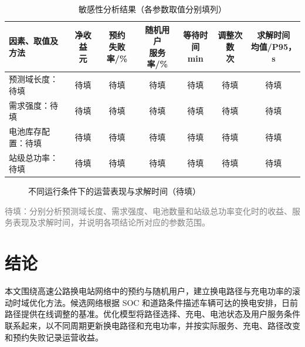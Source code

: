 \documentclass[12pt,a4paper,UTF8]{ctexart}
\numberwithin{equation}{section}
\newcommand{\todoresult}[1]{\textcolor{gray}{#1}}
\begin{document}
\begin{table}[!htbp]
  \centering
  \caption{敏感性分析结果（各参数取值分别填列）}
  \label{exp:sensitivity_results}
  \small
  \setlength{\tabcolsep}{3pt}
  \begin{tabularx}{\linewidth}{@{}Xcccccc@{}}
    \toprule
    因素、取值及方法 & \shortstack{净收益\\元} & \shortstack{预约\\失败率/\%} & \shortstack{随机用户\\服务率/\%} & \shortstack{等待时间\\min} & \shortstack{调整次数\\次} & \shortstack{求解时间\\均值/P95，s} \\
    \midrule
    预测域长度：待填 & 待填 & 待填 & 待填 & 待填 & 待填 & 待填 \\
    需求强度：待填 & 待填 & 待填 & 待填 & 待填 & 待填 & 待填 \\
    电池库存配置：待填 & 待填 & 待填 & 待填 & 待填 & 待填 & 待填 \\
    站级总功率：待填 & 待填 & 待填 & 待填 & 待填 & 待填 & 待填 \\
    \bottomrule
  \end{tabularx}
\end{table}

\begin{figure}[!htbp]
  \centering
  \caption{不同运行条件下的运营表现与求解时间（待填）}
  \label{exp:sensitivity_figure}
\end{figure}

\todoresult{待填：分别分析预测域长度、需求强度、电池数量和站级总功率变化时的收益、服务表现及求解时间，并说明各项结论所对应的参数范围。}

\section{结论}

本文围绕高速公路换电站网络中的预约与随机用户，建立换电路径与充电功率的滚动时域优化方法。候选网络根据 SOC 和道路条件描述车辆可达的换电安排，日前路径提供在线调整的基准。优化模型将路径选择、充电、电池状态及用户服务条件联系起来，以不同周期更新换电路径和充电功率，并按实际服务、充电、路径改变和预约失败记录运营收益。
\end{document}

